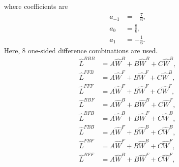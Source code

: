where coefficients are 
\begin{subequations}
\begin{align}
	a_{-1} &= - \frac{7}{6}, \\
	a_{0} &= \frac{8}{6}, \\
	a_{1} &= -\frac{1}{6}.
\end{align} 
\end{subequations}
Here, 8 one-sided difference combinations are used.
\begin{subequations}
\begin{align}
	\hat{L}^{BBB} &= A \hat{W}^{B} + B\hat{W}^{B} + C\hat{W}^{B}, \\
	\hat{L}^{FFB} &= A \hat{W}^{F} + B\hat{W}^{F} + C\hat{W}^{B}, \\
	\hat{L}^{FFF} &= A \hat{W}^{F} + B\hat{W}^{F} + C\hat{W}^{F}, \\
	\hat{L}^{BBF} &= A \hat{W}^{B} + B\hat{W}^{B} + C\hat{W}^{F}, \\
	\hat{L}^{BFB} &= A \hat{W}^{B} + B\hat{W}^{F} + C\hat{W}^{B}, \\
	\hat{L}^{FBB} &= A \hat{W}^{F} + B\hat{W}^{B} + C\hat{W}^{B}, \\
	\hat{L}^{FBF} &= A \hat{W}^{F} + B\hat{W}^{B} + C\hat{W}^{F}, \\
	\hat{L}^{BFF} &= A \hat{W}^{B} + B\hat{W}^{F} + C\hat{W}^{F}, 
\end{align}
\end{subequations}
